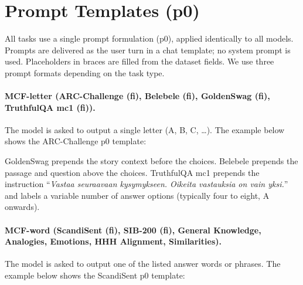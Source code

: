 \documentclass[11pt]{article}
\begin{document}
\section{Prompt Templates (p0)}
\label{app:prompts}

All tasks use a single prompt formulation (p0), applied identically to all models.
Prompts are delivered as the user turn in a chat template; no system prompt
is used. Placeholders in braces are filled from the dataset fields.
We use three prompt formats depending on the task type.

\paragraph{MCF-letter (ARC-Challenge (fi), Belebele (fi), GoldenSwag (fi), TruthfulQA mc1 (fi)).}
The model is asked to output a single letter (A, B, C, …).
The example below shows the ARC-Challenge p0 template:

\vspace{4pt}
{\setlength{\fboxrule}{0.4pt}\setlength{\fboxsep}{6pt}%
\noindent{}}
\vspace{4pt}

GoldenSwag prepends the story context before the choices.
Belebele prepends the passage and question above the choices.
TruthfulQA mc1 prepends the instruction
``\textit{Vastaa seuraavaan kysymykseen. Oikeita vastauksia on vain yksi.}''
and labels a variable number of answer options (typically four to eight, A onwards).

\paragraph{MCF-word (ScandiSent (fi), SIB-200 (fi), General Knowledge,
  Analogies, Emotions, HHH Alignment, Similarities).}
The model is asked to output one of the listed answer words or phrases.
The example below shows the ScandiSent p0 template:

\vspace{4pt}
{\setlength{\fboxrule}{0.4pt}\setlength{\fboxsep}{6pt}%
\noindent{}}
\vspace{4pt}
\end{document}
